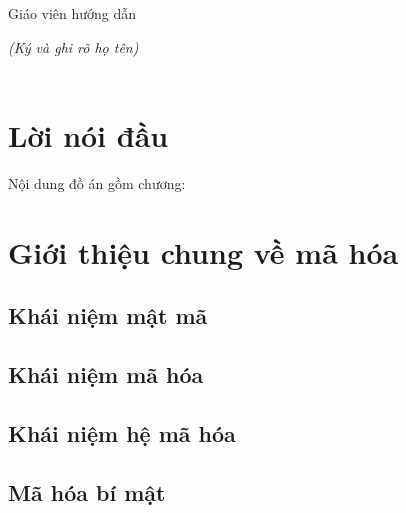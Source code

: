 \documentclass[13pt]{extreport}
\begin{document}
\hspace{3.5in}Giáo viên hướng dẫn\

\hspace{3.5in}\textit{(Ký và ghi rõ họ tên)}\\[1.5cm]\
\tableofcontents
\newpage
\chapter*{Lời nói đầu}

\quad
\newpage
 Nội dung đồ án gồm chương:

\chapter{Giới thiệu chung về mã hóa}

\section{Khái niệm mật mã}

\section{Khái niệm mã hóa}

\section{Khái niệm hệ mã hóa}

\section{Mã hóa bí mật}
\end{document}
